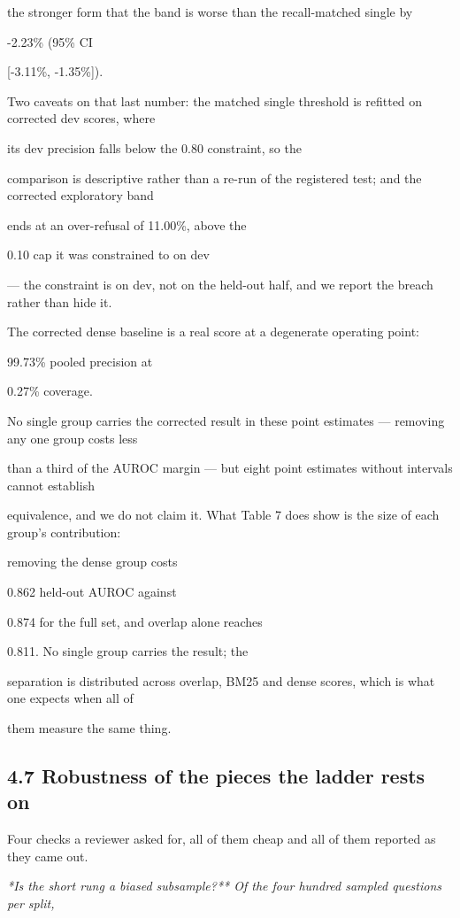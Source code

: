 the stronger form that the band is worse than the recall-matched single by

-2.23\% (95\% CI

[-3.11\%, -1.35\%]).

Two caveats on that last number: the matched single threshold is refitted on corrected dev scores, where

its dev precision falls below the 0.80 constraint, so the

comparison is descriptive rather than a re-run of the registered test; and the corrected exploratory band

ends at an over-refusal of 11.00\%, above the

0.10 cap it was constrained to on dev

--- the constraint is on dev, not on the held-out half, and we report the breach rather than hide it.

The corrected dense baseline is a real score at a degenerate operating point:

99.73\% pooled precision at

0.27\% coverage.

No single group carries the corrected result in these point estimates --- removing any one group costs less

than a third of the AUROC margin --- but eight point estimates without intervals cannot establish

equivalence, and we do not claim it. What Table 7 does show is the size of each group's contribution:

removing the dense group costs

0.862 held-out AUROC against

0.874 for the full set, and overlap alone reaches

0.811. No single group carries the result; the

separation is distributed across overlap, BM25 and dense scores, which is what one expects when all of

them measure the same thing.

\subsection{4.7 Robustness of the pieces the ladder rests on}
Four checks a reviewer asked for, all of them cheap and all of them reported as they came out.

\textit{*Is the short rung a biased subsample?** Of the four hundred sampled questions per split,}

